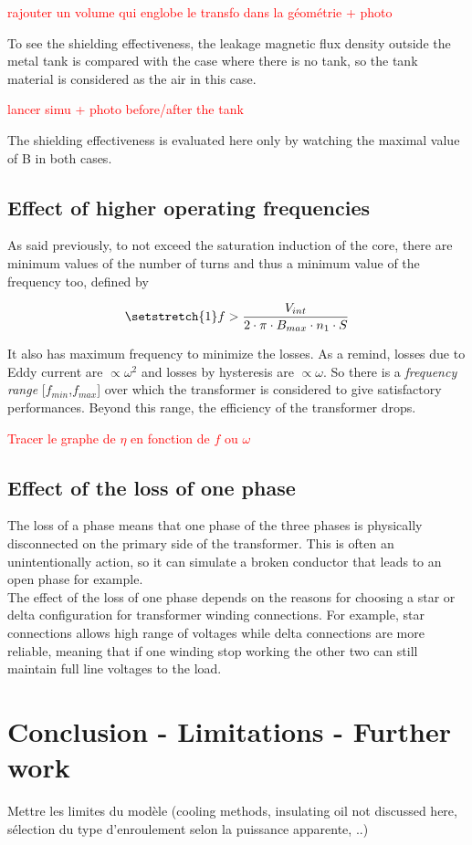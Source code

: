 \documentclass[12pt,a4paper]{report}
\begin{document}
\textcolor{red}{rajouter un volume qui englobe le transfo dans la géométrie + photo}

To see the shielding effectiveness, the leakage magnetic flux density outside the metal tank is compared with the case where there is no tank, so the tank material is considered as the air in this case.

\textcolor{red}{lancer simu + photo before/after the tank}

The shielding effectiveness is evaluated here only by watching the maximal value of B in both cases.


\subsection{Effect of higher operating frequencies}
As said previously, to not exceed the saturation induction of the core, there are minimum values of the number of turns and thus a minimum value of the frequency too, defined by

\begin{equation}
\setstretch{1}
    f > \frac{V_{int}}{2 \cdot \pi \cdot B_{max}\cdot n_1 \cdot S}\label{eq:f_min}
\end{equation}

It also has maximum frequency to minimize the losses. As a remind, losses due to Eddy current are $\propto \omega^2$ and losses by hysteresis are $\propto \omega$. So there is a \textit{frequency range} [$f_{min}$,$f_{max}$] over which the transformer is considered to give satisfactory performances. Beyond this range, the efficiency of the transformer drops.

\textcolor{red}{Tracer le graphe de $\eta$ en fonction de $f$ ou $\omega$}

\subsection{Effect of the loss of one phase}
The loss of a phase means that one phase of the three phases is physically disconnected on the primary side of the transformer. This is often an unintentionally action, so it can simulate a broken conductor that leads to an open phase for example.\\

The effect of the loss of one phase depends on the reasons for choosing a star or delta configuration for transformer winding connections. For example, star connections allows high range of voltages while delta connections are more reliable, meaning that if one winding stop working the other two can still maintain full line voltages to the load.

\section{Conclusion - Limitations - Further work}
Mettre les limites du modèle (cooling methods, insulating oil not discussed here, sélection du type d'enroulement selon la puissance apparente, ..)
\end{document}

